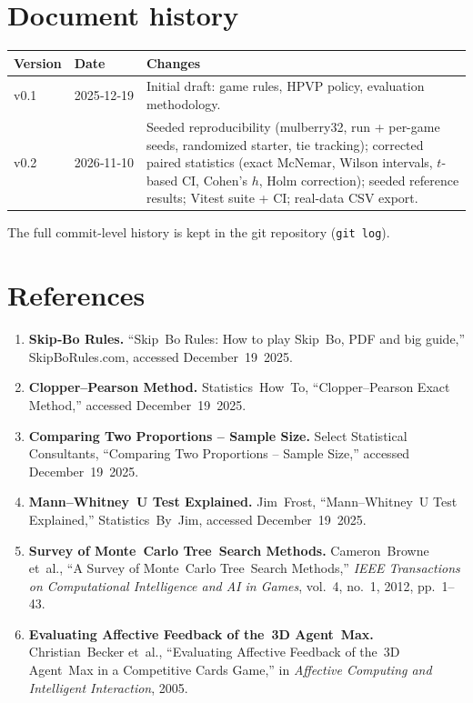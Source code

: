 \documentclass[twoside]{mitthesis}
\begin{document}
\appendix

\chapter*{Document history}
\begin{tabular}{@{}l l p{}@{}}
\toprule
\textbf{Version} & \textbf{Date} & \textbf{Changes} \\
\midrule
v0.1 & 2025‑12‑19 & Initial draft: game rules, HPVP policy, evaluation methodology. \\
v0.2 & 2026‑11‑10 & Seeded reproducibility (mulberry32, run + per-game seeds, randomized starter, tie tracking); corrected paired statistics (exact McNemar, Wilson intervals, $t$-based CI, Cohen's $h$, Holm correction); seeded reference results; Vitest suite + CI; real-data CSV export. \\
\bottomrule
\end{tabular}

The full commit-level history is kept in the git repository (\texttt{git log}).

\chapter*{References}
\begin{enumerate}
\item \textbf{Skip‑Bo Rules.} ``Skip Bo Rules: How to play Skip Bo, PDF and big guide,'' SkipBoRules.com, accessed December 19 2025.
\item \textbf{Clopper–Pearson Method.} Statistics How To, ``Clopper–Pearson Exact Method,'' accessed December 19 2025.
\item \textbf{Comparing Two Proportions – Sample Size.}  Select Statistical Consultants, ``Comparing Two Proportions – Sample Size,'' accessed December 19 2025.
\item \textbf{Mann–Whitney U Test Explained.}  Jim Frost, ``Mann–Whitney U Test Explained,'' Statistics By Jim, accessed December 19 2025.
\item \textbf{Survey of Monte Carlo Tree Search Methods.}  Cameron Browne et al., ``A Survey of Monte Carlo Tree Search Methods,'' \emph{IEEE Transactions on Computational Intelligence and AI in Games}, vol.~4, no.~1, 2012, pp.~1–43.
\item \textbf{Evaluating Affective Feedback of the 3D Agent Max.}  Christian Becker et al., ``Evaluating Affective Feedback of the 3D Agent Max in a Competitive Cards Game,'' in \emph{Affective Computing and Intelligent Interaction}, 2005.
\end{enumerate}
\end{document}
